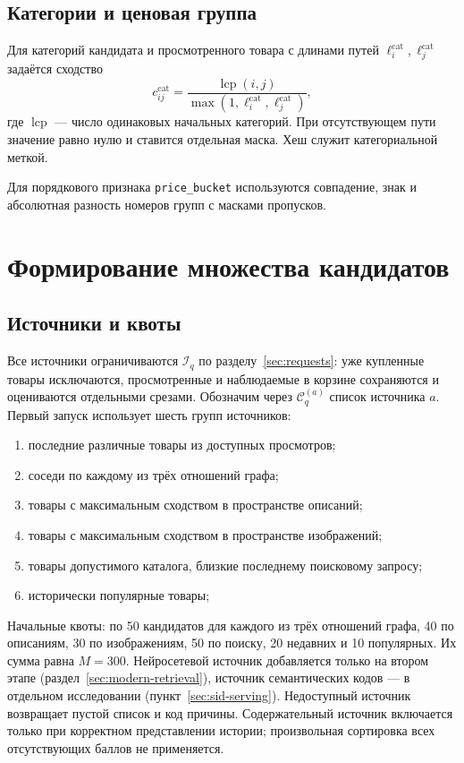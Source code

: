 \documentclass[12pt,a4paper]{article}
\newcommand{\code}[1]{{\ttfamily\small\nolinkurl{#1}}}
\theoremstyle{plainru}
\begin{document}
\subsection{Категории и ценовая группа}

Для категорий кандидата и просмотренного товара с длинами путей
$\ell_i^{\mathrm{cat}},\ell_j^{\mathrm{cat}}$ задаётся сходство
\begin{equation}\label{eq:model-category-similarity}
c_{ij}^{\mathrm{cat}}=
\frac{\operatorname{lcp}(i,j)}
 {\max(1,\ell_i^{\mathrm{cat}},\ell_j^{\mathrm{cat}})},
\end{equation}
где $\operatorname{lcp}$ --- число одинаковых начальных категорий.
При отсутствующем пути значение равно нулю и ставится отдельная маска.
Хеш служит категориальной меткой.

Для порядкового признака \code{price_bucket} используются совпадение,
знак и абсолютная разность номеров групп с масками пропусков.

\section{Формирование множества кандидатов}\label{sec:model-candidates}

\subsection{Источники и квоты}

Все источники ограничиваются $\mathcal I_q$ по разделу~\ref{sec:requests}:
уже купленные товары исключаются, просмотренные и наблюдаемые
в корзине сохраняются и оцениваются отдельными срезами.
Обозначим через $\mathcal C_q^{(a)}$ список источника $a$.
Первый запуск использует шесть групп источников:
\begin{enumerate}
\item последние различные товары из доступных просмотров;
\item соседи по каждому из трёх отношений графа;
\item товары с максимальным сходством в пространстве описаний;
\item товары с максимальным сходством в пространстве изображений;
\item товары допустимого каталога, близкие последнему поисковому запросу;
\item исторически популярные товары;
\end{enumerate}
Начальные квоты: по 50 кандидатов для каждого из трёх отношений графа,
40 по описаниям, 30 по изображениям, 50 по поиску,
20 недавних и 10 популярных. Их сумма равна \(M=300\).
Нейросетевой источник добавляется только на втором этапе
(раздел~\ref{sec:modern-retrieval}), источник семантических кодов ---
в отдельном исследовании (пункт~\ref{sec:sid-serving}).
Недоступный источник возвращает пустой список и код причины.
Содержательный источник включается только при корректном представлении
истории; произвольная сортировка всех отсутствующих баллов не применяется.
\end{document}
